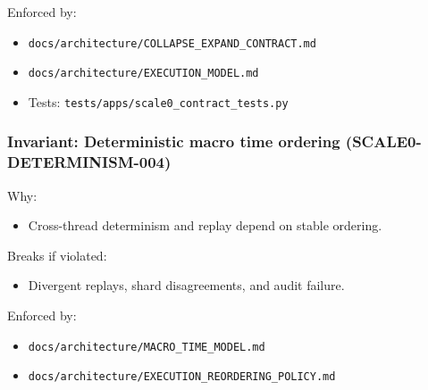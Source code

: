 \documentclass[9pt,a4paper,openany]{book}
\begin{document}
Enforced by:



\begin{itemize}
\item \texttt{docs/\allowbreak{}architecture/\allowbreak{}COLLAPSE\_\allowbreak{}EXPAND\_\allowbreak{}CONTRACT.\allowbreak{}md}
\end{itemize}


\begin{itemize}
\item \texttt{docs/\allowbreak{}architecture/\allowbreak{}EXECUTION\_\allowbreak{}MODEL.\allowbreak{}md}
\end{itemize}


\begin{itemize}
\item Tests: \texttt{tests/\allowbreak{}apps/\allowbreak{}scale0\_\allowbreak{}contract\_\allowbreak{}tests.\allowbreak{}py}
\end{itemize}





\subsubsection{Invariant: Deterministic macro time ordering (SCALE0-DETERMINISM-004)}


Why:



\begin{itemize}
\item Cross-\allowbreak{}thread determinism and replay depend on stable ordering.\allowbreak{}
\end{itemize}


Breaks if violated:



\begin{itemize}
\item Divergent replays, shard disagreements, and audit failure.\allowbreak{}
\end{itemize}


Enforced by:



\begin{itemize}
\item \texttt{docs/\allowbreak{}architecture/\allowbreak{}MACRO\_\allowbreak{}TIME\_\allowbreak{}MODEL.\allowbreak{}md}
\end{itemize}


\begin{itemize}
\item \texttt{docs/\allowbreak{}architecture/\allowbreak{}EXECUTION\_\allowbreak{}REORDERING\_\allowbreak{}POLICY.\allowbreak{}md}
\end{itemize}
\end{document}
